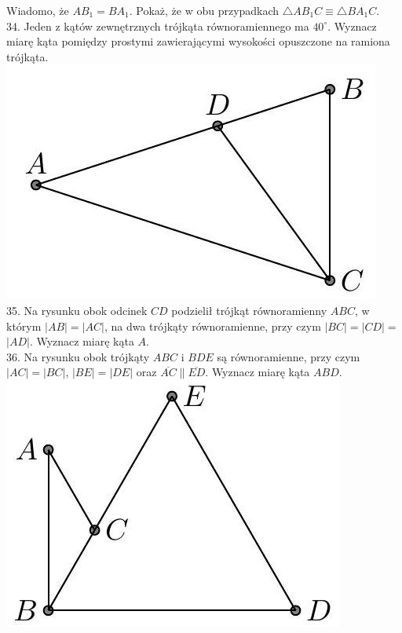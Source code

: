 \documentclass[10pt]{article}
\begin{document}
Wiadomo, że \(A B_{1}=B A_{1}\). Pokaż, że w obu przypadkach \(\triangle A B_{1} C \equiv \triangle B A_{1} C\).\\
34. Jeden z kątów zewnętrznych trójkąta równoramiennego ma \(40^{\circ}\). Wyznacz miarę kąta pomiędzy prostymi zawierającymi wysokości opuszczone na ramiona trójkąta.\\
\includegraphics[max width=\textwidth, center]{2024_11_21_71f62bd117d375398909g-175(1)}\\
35. Na rysunku obok odcinek \(C D\) podzielił trójkąt równoramienny \(A B C\), w którym \(|A B|=|A C|\), na dwa trójkąty równoramienne, przy czym \(|B C|=|C D|=\) \(|A D|\). Wyznacz miarę kąta \(A\).\\
36. Na rysunku obok trójkąty \(A B C\) i \(B D E\) są równoramienne, przy czym \(|A C|=|B C|\), \(|B E|=|D E|\) oraz \(\overline{A C} \| \overline{E D}\). Wyznacz miarę kąta \(A B D\).\\
\includegraphics[max width=\textwidth, center]{2024_11_21_71f62bd117d375398909g-175}\\
\end{document}
